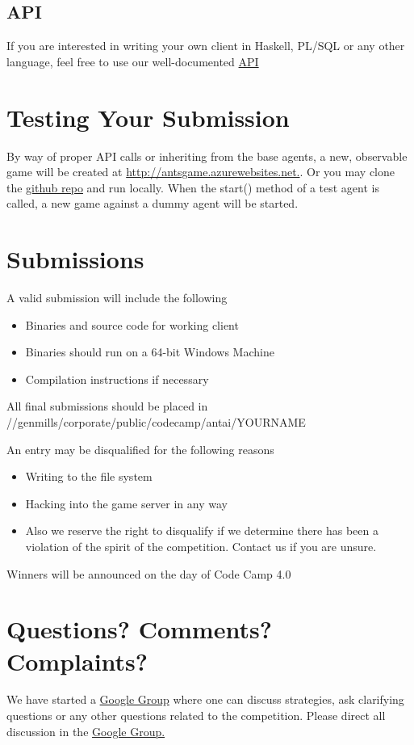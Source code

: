 \documentclass{article}
\begin{document}
\subsection{API}
If you are interested in writing your own client in Haskell, PL/SQL or any other language, feel free to use our well-documented \href{http://antsgame.azurewebsites.net/Help}{API}

\section{Testing Your Submission}

By way of proper API calls or inheriting from the base agents, a new, observable game will be created at \url{http://antsgame.azurewebsites.net.}. Or you may clone the \href{https://github.com/eonarheim/AntAICompetition}{github repo} and run locally.
\newline
\newline
When the start() method of a test agent is called, a new game against a dummy agent will be started. 

\section{Submissions}
A valid submission will include the following
\begin{itemize}
  \item Binaries and source code for working client
  \item Binaries should run on a 64-bit Windows Machine
  \item Compilation instructions if necessary
\end{itemize}


\noindent All final submissions should be placed in //genmills/corporate/public/codecamp/antai/YOURNAME
\newline
\newline

\noindent An entry may be disqualified for the following reasons
\begin{itemize}
  \item Writing to the file system
  \item Hacking into the game server in any way
  \item  Also we reserve the right to disqualify if we determine there has been a violation of the spirit of the competition. Contact us if you are unsure.
\end{itemize}

\noindent Winners will be announced on the day of Code Camp 4.0

\section{Questions? Comments? Complaints?}

We have started a \href{https://groups.google.com/forum/#!forum/gmi-ant-ai-challenge}{Google Group} where one can discuss strategies, ask clarifying questions or any other questions related to the competition. Please direct all discussion in the \href{https://groups.google.com/forum/#!forum/gmi-ant-ai-challenge}{Google Group.}
\end{document}

